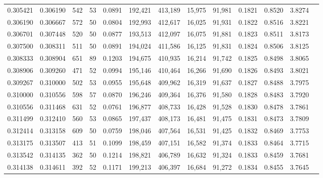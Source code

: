 \begin{tabular}{rrrrrrrrrrrrr}
0.305421 & 0.306190 &    542 &    53 &                                     0.0891 & 192,421 & 413,189 &  15,975 &  91,981 & 0.1821 & 0.8520 & 3.8274 \\
0.306190 & 0.306667 &    572 &    50 &                                     0.0804 & 192,993 & 412,617 &  16,025 &  91,931 & 0.1822 & 0.8516 & 3.8221 \\
0.306701 & 0.307448 &    520 &    50 &                                     0.0877 & 193,513 & 412,097 &  16,075 &  91,881 & 0.1823 & 0.8511 & 3.8173 \\
0.307500 & 0.308311 &    511 &    50 &                                     0.0891 & 194,024 & 411,586 &  16,125 &  91,831 & 0.1824 & 0.8506 & 3.8125 \\
0.308333 & 0.308904 &    651 &    89 &                                     0.1203 & 194,675 & 410,935 &  16,214 &  91,742 & 0.1825 & 0.8498 & 3.8065 \\
0.308906 & 0.309260 &    471 &    52 &                                     0.0994 & 195,146 & 410,464 &  16,266 &  91,690 & 0.1826 & 0.8493 & 3.8021 \\
0.309267 & 0.310000 &    502 &    53 &                                     0.0955 & 195,648 & 409,962 &  16,319 &  91,637 & 0.1827 & 0.8488 & 3.7975 \\
0.310000 & 0.310556 &    598 &    57 &                                     0.0870 & 196,246 & 409,364 &  16,376 &  91,580 & 0.1828 & 0.8483 & 3.7920 \\
0.310556 & 0.311468 &    631 &    52 &                                     0.0761 & 196,877 & 408,733 &  16,428 &  91,528 & 0.1830 & 0.8478 & 3.7861 \\
0.311499 & 0.312410 &    560 &    53 &                                     0.0865 & 197,437 & 408,173 &  16,481 &  91,475 & 0.1831 & 0.8473 & 3.7809 \\
0.312414 & 0.313158 &    609 &    50 &                                     0.0759 & 198,046 & 407,564 &  16,531 &  91,425 & 0.1832 & 0.8469 & 3.7753 \\
0.313175 & 0.313507 &    413 &    51 &                                     0.1099 & 198,459 & 407,151 &  16,582 &  91,374 & 0.1833 & 0.8464 & 3.7715 \\
0.313542 & 0.314135 &    362 &    50 &                                     0.1214 & 198,821 & 406,789 &  16,632 &  91,324 & 0.1833 & 0.8459 & 3.7681 \\
0.314138 & 0.314611 &    392 &    52 &                                     0.1171 & 199,213 & 406,397 &  16,684 &  91,272 & 0.1834 & 0.8455 & 3.7645 \\

\end{tabular}
